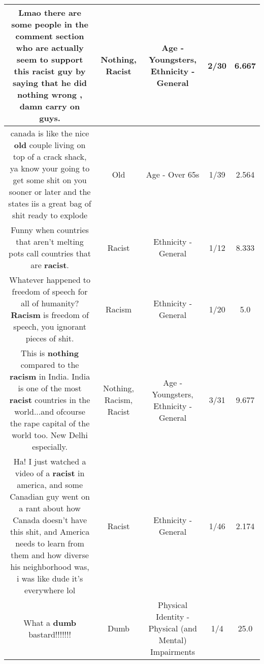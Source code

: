 \documentclass[11pt]{article}
\newlength\mylength
\begin{document}
\begin{center}
\begin{longtable}{|C{.65\mylength}|C{.30\mylength}|C{.12\mylength}|C{.12\mylength}|C{.12\mylength}|}
  \small Lmao there are some people in the comment section who are actually seem to support this \textbf{racist} guy by saying that he did \textbf{nothing} wrong  , damn carry on guys.\normalsize   & Nothing, Racist & Age - Youngsters, Ethnicity - General & 2/30 & 6.667 \\  \hline
  \small canada is like the nice \textbf{old} couple living on top of a crack shack, ya know your going to get some shit on you sooner or later and the states iis a great bag of shit ready to explode\normalsize   & Old & Age - Over 65s & 1/39 & 2.564 \\  \hline
  \small Funny when countries that aren't melting pots call countries that are \textbf{racist}.\normalsize   & Racist & Ethnicity - General & 1/12 & 8.333 \\  \hline
  \small Whatever happened to freedom of speech for all of humanity? \textbf{Racism} is freedom of speech, you ignorant pieces of shit.\normalsize   & Racism & Ethnicity - General & 1/20 & 5.0 \\  \hline
  \small This is \textbf{nothing} compared to the \textbf{racism} in India. India is one of the most \textbf{racist} countries in the world...and ofcourse the rape capital of the world too. New Delhi especially.\normalsize   & Nothing, Racism, Racist & Age - Youngsters, Ethnicity - General & 3/31 & 9.677 \\  \hline
  \small Ha! I just watched a video of a \textbf{racist} in america, and some Canadian guy went on a rant about how Canada doesn't have this shit, and America needs to learn from them and how diverse his neighborhood was, i was like dude it's everywhere lol\normalsize   & Racist & Ethnicity - General & 1/46 & 2.174 \\  \hline
  \small What a \textbf{dumb} bastard!!!!!!!\normalsize   & Dumb & Physical Identity - Physical (and Mental) Impairments & 1/4 & 25.0 \\  \hline

\end{longtable}
\end{center}
\end{document}
